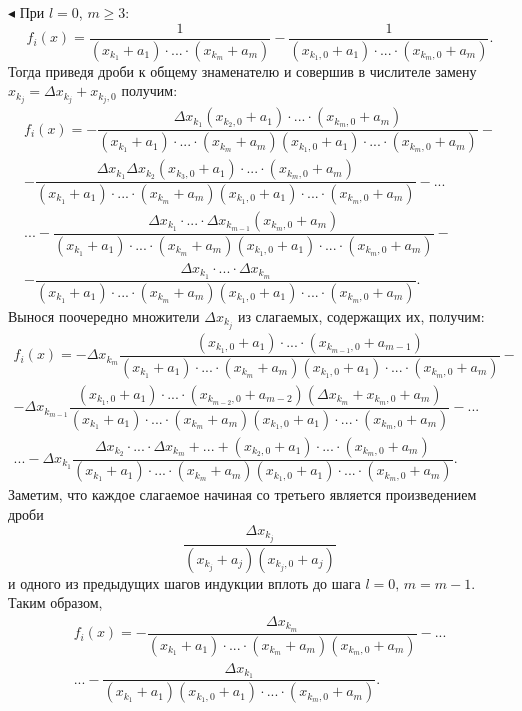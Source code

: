 \documentclass[12pt,a4paper]{extarticle}
\renewenvironment{proof}{\noindent$\blacktriangleleft$}{}
\theoremstyle{definition}
\theoremstyle{definition}
\theoremstyle{definition}
\begin{document}
\begin{proof}
		При $l=0$, $m\ge3$:
		\[f_i(x)=\dfrac{1}{(x_{k_1}+a_1)\cdot...\cdot(x_{k_m}+a_m)}-\dfrac{1}{(x_{k_1,0}+a_1)\cdot...\cdot(x_{k_m,0}+a_m)}.\]
		Тогда приведя дроби к общему знаменателю и совершив в числителе замену $x_{k_j}=\Delta x_{k_j} + x_{k_j,0}$ получим:
		\begin{multline*}
			f_i(x)=-\dfrac{\Delta x_{k_1}(x_{k_2,0}+a_1)\cdot...\cdot(x_{k_m,0}+a_m)}{(x_{k_1}+a_1)\cdot...\cdot(x_{k_m}+a_m)(x_{k_1,0}+a_1)\cdot...\cdot(x_{k_m,0}+a_m)}-\\
			-\dfrac{\Delta x_{k_1}\Delta x_{k_2}(x_{k_3,0}+a_1)\cdot...\cdot(x_{k_m,0}+a_m)}{(x_{k_1}+a_1)\cdot...\cdot(x_{k_m}+a_m)(x_{k_1,0}+a_1)\cdot...\cdot(x_{k_m,0}+a_m)}-...\\
			...-\dfrac{\Delta x_{k_1}\cdot...\cdot\Delta x_{k_{m-1}}(x_{k_m,0}+a_m)}{(x_{k_1}+a_1)\cdot...\cdot(x_{k_m}+a_m)(x_{k_1,0}+a_1)\cdot...\cdot(x_{k_m,0}+a_m)}-\\
			-\dfrac{\Delta x_{k_1}\cdot...\cdot\Delta x_{k_{m}}}{(x_{k_1}+a_1)\cdot...\cdot(x_{k_m}+a_m)(x_{k_1,0}+a_1)\cdot...\cdot(x_{k_m,0}+a_m)}.
		\end{multline*}
		Вынося поочередно множители $\Delta x_{k_j}$ из слагаемых, содержащих их, получим:
		\begin{multline*}
			f_i(x)=-\Delta x_{k_m}\dfrac{(x_{k_1,0}+a_1)\cdot...\cdot(x_{k_{m-1},0}+a_{m-1})}{(x_{k_1}+a_1)\cdot...\cdot(x_{k_m}+a_m)(x_{k_1,0}+a_1)\cdot...\cdot(x_{k_m,0}+a_m)}-\\
			-\Delta x_{k_{m-1}}\dfrac{(x_{k_1,0}+a_1)\cdot...\cdot(x_{k_{m-2},0}+a_{m-2})(\Delta x_{k_m}+x_{k_m,0}+a_m)}{(x_{k_1}+a_1)\cdot...\cdot(x_{k_m}+a_m)(x_{k_1,0}+a_1)\cdot...\cdot(x_{k_m,0}+a_m)}-...\\
			...-\Delta x_{k_1}\dfrac{\Delta x_{k_2}\cdot...\cdot\Delta x_{k_m}+...+(x_{k_2,0}+a_1)\cdot...\cdot(x_{k_m,0}+a_m)}{(x_{k_1}+a_1)\cdot...\cdot(x_{k_m}+a_m)(x_{k_1,0}+a_1)\cdot...\cdot(x_{k_m,0}+a_m)}.
		\end{multline*}
		Заметим, что каждое слагаемое начиная со третьего является произведением дроби 
		\[\frac{\Delta x_{k_j}}{(x_{k_j}+a_j)(x_{k_j,0}+a_j)}\] 
		и одного из предыдущих шагов индукции вплоть до шага $l=0,\, m=m-1$. Таким образом, 
		\begin{multline*}
			f_i(x)=-\dfrac{\Delta x_{k_m}}{(x_{k_1}+a_1)\cdot...\cdot(x_{k_m}+a_m)(x_{k_m,0}+a_m)}-...\\
			...-\dfrac{\Delta x_{k_1}}{(x_{k_1}+a_1)(x_{k_1,0}+a_1)\cdot...\cdot(x_{k_m,0}+a_m)}.
		\end{multline*}
		

\end{proof}
\end{document}
